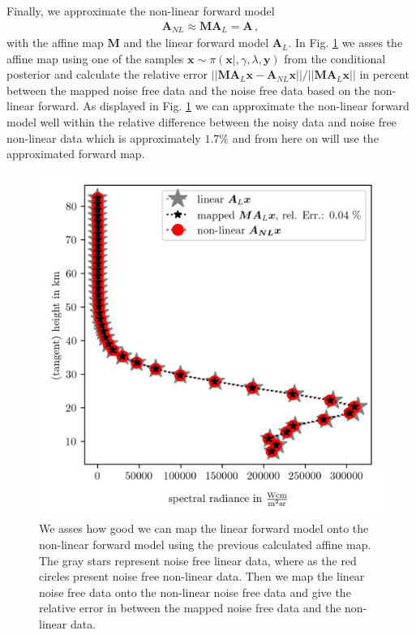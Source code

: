 Finally, we approximate the non-linear forward model
\begin{align}
	\bm{A}_{NL} \approx \bm{M A}_L = \bm{A} \, ,
\end{align}
with the affine map $\bm{M}$ and the linear forward model $\bm{A}_L$.
In Fig. \ref{fig:MapAsses} we asses the affine map using one of the samples $\bm{x} \sim \pi(\bm{x}|, \gamma, \lambda, \bm{y}) $ from the conditional posterior and calculate the relative error $|| \bm{M}\bm{A}_L \bm{x} - \bm{A}_{NL} \bm{x} || / || \bm{M}\bm{A}_L \bm{x} ||$ in percent between the mapped noise free data and the noise free data based on the non-linear forward.
As displayed in Fig. \ref{fig:MapAsses} we can approximate the non-linear forward model well within the relative difference between the noisy data and noise free non-linear data which is approximately $ 1.7 \%$ and from here on will use the approximated forward map.
\begin{figure}[ht!]
	\centering
	\includegraphics{SampMapAssesmentTT.png}
	\caption[Assessment of affine map.]{We asses how good we can map the linear forward model onto the non-linear forward model using the previous calculated affine map. The gray stars represent noise free linear data, where as the red circles present noise free non-linear data. Then we map the linear noise free data onto the non-linear noise free data and give the relative error in between the mapped noise free data and the non-linear data.}
	\label{fig:MapAsses}
\end{figure}



